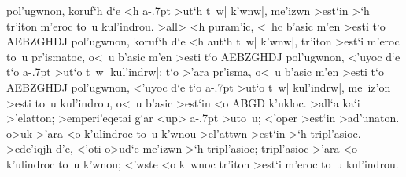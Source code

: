 \begin{Parallel}{}{}
{{pol'ugwnon, koruf`h d`e <h a\kern -.7pt >ut`h t~w| k'wnw|, me'izwn >est`in >`h tr'iton m'eroc to~u kul'indrou. >all> <h
puram'ic, <~hc b'asic m'en >esti t`o AEBZGHDJ pol'ugwnon, koruf`h d`e <h 
aut`h t~w| k'wnw|, tr'iton
>est`i m'eroc to~u pr'ismatoc, o<~u b'asic m'en >esti t`o AEBZGHDJ pol'ugwnon, <'uyoc
d`e t`o a\kern -.7pt >ut`o t~w| kul'indrw|; t`o >'ara pr'isma, o<~u b'asic m'en >esti t`o AEBZGHDJ pol'ugwnon, <'uyoc
d`e t`o a\kern -.7pt >ut`o t~w| kul'indrw|, me~iz'on >esti to~u kul'indrou, o<~u b'asic >est`in <o ABGD k'ukloc. >all`a
ka`i >'elatton; >emperi'eqetai g`ar <up> a\kern -.7pt >uto~u;  <'oper >est`in >ad'unaton. o>uk >'ara <o k'ulindroc
to~u k'wnou >el'attwn >est`in >`h tripl'asioc. >ede'iqjh d'e, <'oti o>ud`e me'izwn >`h tripl'asioc; tripl'asioc
>'ara <o k'ulindroc to~u k'wnou; <'wste <o k~wnoc tr'iton >est`i m'eroc to~u kul'indrou.}

}

\end{Parallel}
